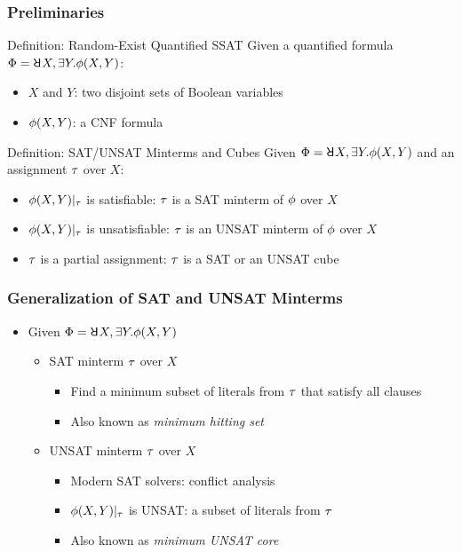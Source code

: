 \begin{frame}
    \frametitle{Preliminaries}
    \begin{block}{Definition: Random-Exist Quantified SSAT}
        Given a quantified formula $\Qf=\random{} X,\exists Y.\pf(X,Y)$:
        \begin{itemize}
            \item $X$ and $Y$: two disjoint sets of Boolean variables
            \item $\phi(X,Y)$: a CNF formula
        \end{itemize}
    \end{block}
    \pause
    \begin{block}{Definition: SAT/UNSAT Minterms and Cubes}
        Given $\Qf=\random{} X,\exists Y.\pf(X,Y)$ and an assignment $\tau$ over $X$:
        \begin{itemize}
            \item $\phi(X,Y)|_{\tau}$ is satisfiable: $\tau$ is a SAT minterm of $\phi$ over $X$
            \item $\phi(X,Y)|_{\tau}$ is unsatisfiable: $\tau$ is an UNSAT minterm of $\phi$ over $X$
            \item $\tau$ is a partial assignment: $\tau$ is a SAT or an UNSAT cube
        \end{itemize}
    \end{block}
\end{frame}

\begin{frame}
    \frametitle{Generalization of SAT and UNSAT Minterms}
    \begin{itemize}
        \item Given $\Qf=\random{} X,\exists Y.\pf(X,Y)$
              \begin{itemize}
                  \item SAT minterm $\tau$ over $X$
                        \begin{itemize}
                            \item Find a minimum subset of literals from $\tau$ that satisfy all clauses
                            \item Also known as \textit{minimum hitting set}
                        \end{itemize}
                  \item UNSAT minterm $\tau$ over $X$
                        \begin{itemize}
                            \item Modern SAT solvers: conflict analysis
                            \item $\phi(X,Y)|_{\tau}$ is UNSAT: a subset of literals from $\tau$
                            \item Also known as \textit{minimum UNSAT core}
                        \end{itemize}
              \end{itemize}
    \end{itemize}
\end{frame}